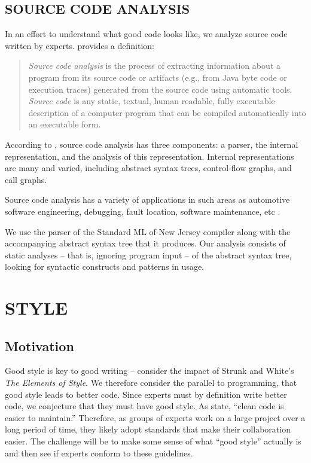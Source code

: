 \documentclass[12pt,abstracton]{scrartcl}
\begin{document}
\subsection{SOURCE CODE ANALYSIS}
In an effort to understand what good code looks like, we analyze source code
written by experts. \cite{Bin07} provides a definition:
\begin{quote}
\emph{Source code analysis} is the process of extracting
information about a program from its source code
or artifacts (e.g., from Java byte code or execution
traces) generated from the source code using automatic tools.
\emph{Source code} is any static, textual,
human readable, fully executable description of
a computer program that can be compiled automatically into an executable form.
\end{quote}

According to \cite{Bin07}, source code analysis has three components: a parser,
the internal representation, and the analysis of this representation.
Internal representations are many and varied, including abstract syntax trees,
control-flow graphs, and call graphs.

Source code analysis has a variety of applications in such areas as
automotive software engineering, debugging, fault location, software maintenance,
etc \cite{Bin07}.

We use the parser of the Standard ML of New Jersey compiler along with the accompanying
abstract syntax tree that it produces. Our analysis
consists of static analyses -- that is, ignoring program input -- of the abstract syntax tree, looking for
syntactic constructs and patterns in usage.
\section{STYLE}\label{sec:style}
\subsection{Motivation}\label{subsec:style}
Good style is key to good writing -- consider the impact
of Strunk and White's \emph{The Elements of Style}.
We therefore consider the parallel to programming, that
good style leads to better code. Since experts must by
definition write better code, we conjecture that they
must have good style. 
As \cite{Ker78} state, ``clean code is easier to maintain.''
Therefore, as groups of experts work on a large project over
a long period of time, they likely adopt standards that
make their collaboration easier.
The challenge will be to 
make some sense of what ``good style'' actually is
and then see if experts conform to these guidelines.
\end{document}
